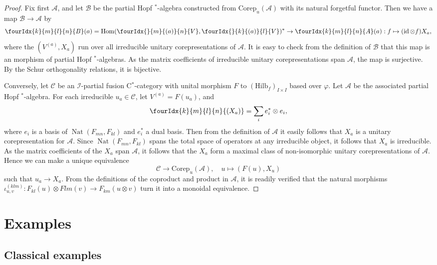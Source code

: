 \documentclass[11pt]{article}
\DeclareMathOperator{\id}{id}
\DeclareMathOperator{\Hom}{Hom}
\DeclareMathOperator{\Nat}{\mathrm{Nat}}
\newcommand{\Corep}{\mathrm{Corep}}
\newcommand{\CatCC}{\mathscr{C}}
\newcommand{\Hilb}{\mathrm{Hilb}}
\newcommand{\Gr}[5]{\fourIdx{#2}{#4}{#3}{#5}{#1}}%
\theoremstyle{definition}
\numberwithin{equation}{section}
\begin{document}
\begin{proof} Fix first $\mathscr{A}$, and let $\mathscr{B}$ be the partial Hopf $^*$-algebra constructed from $\Corep_u(\mathscr{A})$ with its natural forgetful functor. Then we have a map $\mathscr{B} \rightarrow \mathscr{A}$ by \[ \Gr{B}{k}{l}{m}{n}(a) = \Hom(\Gr{V}{}{(a)}{m}{n},\Gr{V}{}{(a)}{k}{l})^* \rightarrow \Gr{A}{k}{l}{m}{n}(a):  f \mapsto (\id\otimes f)X_a,\] where the $(V^{(a)},X_a)$ run over all irreducible unitary corepresentations of $\mathscr{A}$. It is easy to check from the definition of $\mathscr{B}$ that this map is an morphism of partial Hopf $^*$-algebras. As the matrix coefficients of irreducible unitary corepresentations span $\mathscr{A}$, the map is surjective. By the Schur orthogonality relations, it is bijective.

Conversely, let $\CatCC$ be an $\mathscr{I}$-partial fusion C$^*$-category with unital morphism $F$ to $(\Hilb_f)_{I\times I}$ based over $\varphi$. Let $\mathscr{A}$ be the associated partial Hopf $^*$-algebra. For each irreducible $u_a \in \CatCC$, let $V^{(a)} = F(u_a)$, and \[\Gr{(X_a)}{k}{l}{m}{n} = \sum_i e_i^*\otimes e_i,\] where $e_i$ is a basis of $\Nat(F_{mn},F_{kl})$ and $e_i^*$ a dual basis. Then from the definition of $\mathscr{A}$ it easily follows that $X_a$ is a unitary corepresentation for $\mathscr{A}$. Since $\Nat(F_{mn},F_{kl})$ spans the total space of operators at any irreducible object, it follows that $X_a$ is irreducible. As the matrix coefficients of the $X_a$ span $\mathscr{A}$, it follows that the $X_a$ form a maximal class of non-isomorphic unitary corepresentations of $\mathscr{A}$. Hence we can make a unique equivalence \[\CatCC\rightarrow \Corep_u(\mathscr{A}), \quad u \mapsto (F(u),X_u)\] such that $u_a\rightarrow X_a$. From the definitions of the coproduct and product in $\mathscr{A}$, it is readily verified that the natural morphisms $\iota^{(klm)}_{u,v}:F_{kl}(u)\otimes F{lm}(v)\rightarrow F_{km}(u\otimes v)$ turn it into a monoidal equivalence. 
\end{proof}


\section{Examples}

\subsection{Classical examples}
\end{document}
